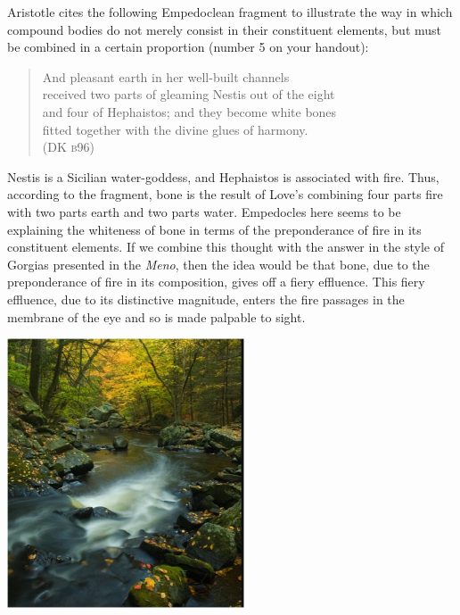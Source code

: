 Aristotle cites the following Empedoclean fragment to illustrate the way in which compound bodies do not merely consist in their constituent elements, but must be combined in a certain proportion (number 5 on your handout):
\begin{verse}
    And pleasant earth in her well-built channels\\
    received two parts of gleaming Nestis out of the eight\\
    and four of Hephaistos; and they become white bones\\
    fitted together with the divine glues of harmony.\\
    (DK \textsc{b}96)
\end{verse}
Nestis is a Sicilian water-goddess, and Hephaistos is associated with fire. Thus, according to the fragment, bone is the result of Love's combining four parts fire with two parts earth and two parts water. Empedocles here seems to be explaining the whiteness of bone in terms of the preponderance of fire in its constituent elements. If we combine this thought with the answer in the style of Gorgias presented in the \emph{Meno}, then the idea would be that bone, due to the preponderance of fire in its composition, gives off a fiery effluence. This fiery effluence, due to its distinctive magnitude, enters the fire passages in the membrane of the eye and so is made palpable to sight. \change

\begin{frame}
	\begin{center}
		\includegraphics[height=8cm]{../../graphics/black_river.jpg}
	\end{center}
\end{frame}

